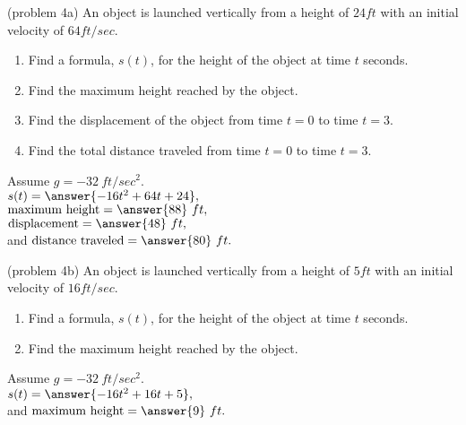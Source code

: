 \documentclass[handout]{ximera}
\begin{document}
\begin{problem}(problem 4a)
An object is launched vertically from a height of $24 ft$ with an initial velocity of $64 ft/sec$.  
\begin{enumerate}
\item Find a formula, $s(t)$, for the height of the object at time $t$
 seconds.
\item Find the maximum height reached by the object.
\item Find the displacement of the object from time $t = 0$ to time $t = 3$.
\item Find the total distance traveled from time $t = 0$ to time $t = 3$.
\end{enumerate}
Assume $g = -32 \ ft/sec^2$.\\
$s(t) = \answer{-16t^2 + 64t + 24},$\\
$\text{maximum height} =\answer{88} \ ft,$\\
$\text{displacement} =\answer{48} \ ft,$\\
and
$\text{distance traveled} = \answer{80} \ ft.$
\end{problem}



\begin{problem}(problem 4b)
An object is launched vertically from a height of $5 ft$ with an initial velocity of $16 ft/sec$.  
\begin{enumerate}
\item Find a formula, $s(t)$, for the height of the object at time $t$
 seconds.
\item Find the maximum height reached by the object.
\end{enumerate}
Assume $g = -32 \ ft/sec^2$.\\
$s(t) = \answer{-16t^2 + 16t + 5},$\\
and
$\text{maximum height} =\answer{9} \ ft.$\\


\end{problem}
\end{document}
